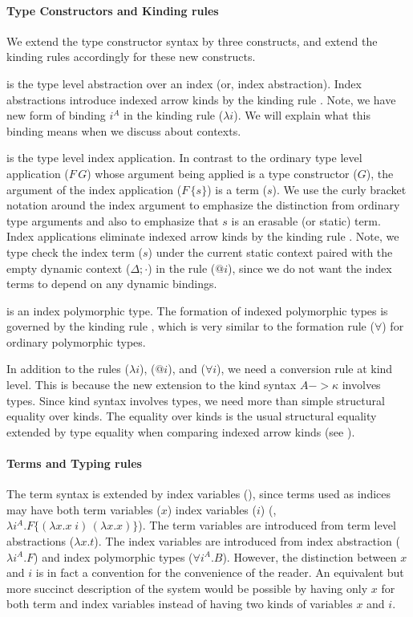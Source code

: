 \paragraph{Type Constructors and Kinding rules}
We extend the type constructor syntax by three constructs,
and extend the kinding rules accordingly for these new constructs.

 is the type level abstraction over an index
(or, index abstraction). Index abstractions introduce indexed arrow kinds
by the kinding rule . Note, we have new form of binding
$i^A$ in the kinding rule ($\lambda i$).
We will explain what this binding means when we discuss about contexts.

 is the type level index application. In contrast to
the ordinary type level application ($F\,G$) whose argument being applied is
a type constructor ($G$), the argument of the index application ($F\,\{s\}$) is
a term ($s$). We use the curly bracket notation around the index argument to
emphasize the distinction from ordinary type arguments and also to emphasize
that $s$ is an erasable (or static) term. Index applications eliminate
indexed arrow kinds by the kinding rule . Note, we type check
the index term ($s$) under the current static context paired with
the empty dynamic context ($\Delta;\cdot$) in the rule ($@i$), since
we do not want the index terms to depend on any dynamic bindings.

 is an index polymorphic type.
The formation of indexed polymorphic types is governed by
the kinding rule , which is very similar to
the formation rule ($\forall$) for ordinary polymorphic types.

In addition to the rules ($\lambda i$), ($@ i$), and ($\forall i$),
we need a conversion rule  at kind level. This is because
the new extension to the kind syntax $A -> \kappa$ involves types.
Since kind syntax involves types, we need more than simple structural
equality over kinds. The equality over kinds is the usual structural
equality extended by type equality when comparing indexed arrow kinds
(see ).

\paragraph{Terms and Typing rules}
The term syntax is extended by index variables (), since terms used
as indices may have both term variables ($x$) index variables ($i$)
(\eg, $\lambda i^A.F\{(\lambda x.x\;i)\,(\lambda x.x)\}$).
The term variables are introduced from term level abstractions ($\lambda x.t$).
The index variables are introduced from index abstraction ($\lambda i^A.F$)
and index polymorphic types ($\forall i^A.B$). However, the distinction between
$x$ and $i$ is in fact a convention for the convenience of the reader.
An equivalent but more succinct description of the system would be possible
by having only $x$ for both term and index variables instead of having two
kinds of variables $x$ and $i$.

